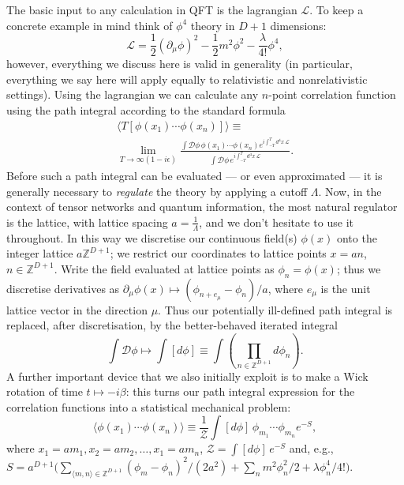\documentclass[twocolumn,lengthcheck,superscriptaddress]{revtex4-1}
\theoremstyle{definition}
\theoremstyle{remark}
\begin{document}
The basic input to any calculation in QFT is the lagrangian $\mathcal{L}$. To keep a concrete example in mind think of $\phi^4$ theory in $D+1$ dimensions:
\begin{equation}
	\mathcal{L} = \frac12 (\partial_\mu\phi)^2 - \frac12m^2 \phi^2 -\frac{\lambda}{4!}\phi^4,
\end{equation}
however, everything we discuss here is valid in generality (in particular, everything we say here will apply equally to relativistic and nonrelativistic settings).  Using the lagrangian we can calculate any $n$-point correlation function using the path integral according to the standard formula
\begin{multline}	
	\langle  T[\phi(x_1)\cdots \phi(x_n)] \rangle\equiv\\ \lim_{T\rightarrow \infty(1-i\epsilon)} \frac{\int \mathcal{D}\phi \, \phi(x_1)\cdots \phi(x_n)e^{i\int_{-T}^T d^4x\, \mathcal{L}}}{\int \mathcal{D}\phi\, e^{i\int_{-T}^T d^4x\, \mathcal{L}}}.
\end{multline} 
Before such a path integral can be evaluated --- or even approximated --- it is generally necessary to \emph{regulate} the theory by applying a cutoff $\Lambda$. Now, in the context of tensor networks and quantum information, the most natural regulator is the lattice, with lattice spacing $a = \frac{1}{\Lambda}$, and we don't hesitate to use it throughout. In this way we discretise our continuous field(s) $\phi(x)$ onto the integer lattice $a\mathbb{Z}^{D+1}$; we restrict our coordinates to lattice points $x = an$, $n \in \mathbb{Z}^{D+1}$. Write the field evaluated at lattice points as $\phi_{n} = \phi(x)$; thus we discretise derivatives as $\partial_\mu \phi(x) \mapsto (\phi_{n + e_{\mu}} - \phi_{n})/a$,   where $e_\mu$ is the unit lattice vector in the direction $\mu$. Thus our potentially ill-defined path integral is replaced, after discretisation, by the better-behaved iterated integral
\begin{equation}
	\int \mathcal{D}\phi \mapsto \int [d\phi] \equiv \int \left(\prod_{n\in\mathbb{Z}^{D+1}} d\phi_n \right).
\end{equation}
A further important device that we also initially exploit is to make a Wick rotation of time $t\mapsto -i\beta$: this turns our path integral expression for the correlation functions into a statistical mechanical problem:
\begin{equation}\label{eq:wrcorr}
	\langle  \phi(x_{1})\cdots \phi(x_n) \rangle\equiv \frac{1}{\mathcal{Z}}\int [d\phi] \, \phi_{m_1}\cdots \phi_{m_n} e^{-S},
\end{equation} 
where $x_1 = a m_1, x_2 = a m_2, \ldots, x_1 = a m_n$, $\mathcal{Z} = \int [d\phi] \, e^{-S}$ and, e.g., $S = a^{D+1}\big(\sum_{\langle m,n\rangle\in \mathbb{Z}^{D+1}} (\phi_m-\phi_n)^2/(2a^2) + \sum_{n} m^2\phi_n^2/2 + \lambda \phi_n^4/4!\big)$.
\end{document}
